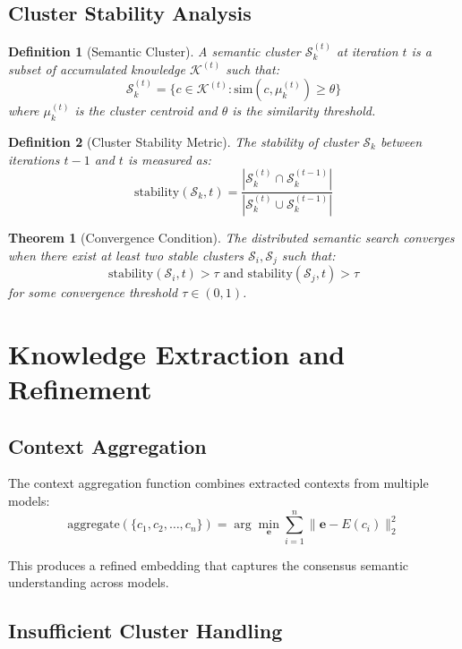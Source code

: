 \documentclass{article}
\newtheorem{definition}{Definition}
\newtheorem{theorem}{Theorem}
\begin{document}
\subsection{Cluster Stability Analysis}

\begin{definition}[Semantic Cluster]
A semantic cluster $\mathcal{S}_k^{(t)}$ at iteration $t$ is a subset of accumulated knowledge $\mathcal{K}^{(t)}$ such that:
$$\mathcal{S}_k^{(t)} = \{c \in \mathcal{K}^{(t)} : \text{sim}(c, \mu_k^{(t)}) \geq \theta\}$$
where $\mu_k^{(t)}$ is the cluster centroid and $\theta$ is the similarity threshold.
\end{definition}

\begin{definition}[Cluster Stability Metric]
The stability of cluster $\mathcal{S}_k$ between iterations $t-1$ and $t$ is measured as:
$$\text{stability}(\mathcal{S}_k, t) = \frac{|\mathcal{S}_k^{(t)} \cap \mathcal{S}_k^{(t-1)}|}{|\mathcal{S}_k^{(t)} \cup \mathcal{S}_k^{(t-1)}|}$$
\end{definition}

\begin{theorem}[Convergence Condition]
The distributed semantic search converges when there exist at least two stable clusters $\mathcal{S}_i, \mathcal{S}_j$ such that:
$$\text{stability}(\mathcal{S}_i, t) > \tau \text{ and } \text{stability}(\mathcal{S}_j, t) > \tau$$
for some convergence threshold $\tau \in (0,1)$.
\end{theorem}

\section{Knowledge Extraction and Refinement}

\subsection{Context Aggregation}

The context aggregation function combines extracted contexts from multiple models:
$$\text{aggregate}(\{c_1, c_2, \ldots, c_n\}) = \arg\min_{\mathbf{e}} \sum_{i=1}^n \|\mathbf{e} - E(c_i)\|_2^2$$

This produces a refined embedding that captures the consensus semantic understanding across models.

\subsection{Insufficient Cluster Handling}
\end{document}
